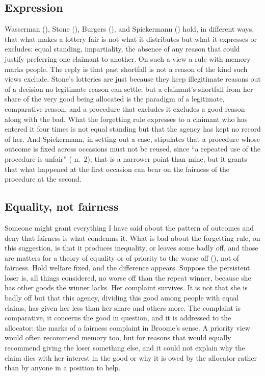 \documentclass[
  11pt,
  letterpaper,
  DIV=11,
  numbers=noendperiod,
  twoside]{scrartcl}
\begin{document}
\subsection{Expression}\label{expression}

Wasserman (), Stone
(), Burgers
(), and Spiekermann
() hold, in different ways, that
what makes a lottery fair is not what it distributes but what it
expresses or excludes: equal standing, impartiality, the absence of any
reason that could justify preferring one claimant to another. On such a
view a rule with memory marks people. The reply is that past shortfall
is not a reason of the kind such views exclude. Stone's lotteries are
just because they keep illegitimate reasons out of a decision no
legitimate reason can settle; but a claimant's shortfall from her share
of the very good being allocated is the paradigm of a legitimate,
comparative reason, and a procedure that excludes it excludes a good
reason along with the bad. What the forgetting rule expresses to a
claimant who has entered it four times is not equal standing but that
the agency has kept no record of her. And Spiekermann, in setting out a
case, stipulates that a procedure whose outcome is fixed across
occasions must not be reused, since ``a repeated use of the procedure is
unfair'' ( n.~2);
that is a narrower point than mine, but it grants that what happened at
the first occasion can bear on the fairness of the procedure at the
second.

\subsection{Equality, not fairness}\label{equality-not-fairness}

Someone might grant everything I have said about the pattern of outcomes
and deny that fairness is what condemns it. What is bad about the
forgetting rule, on this suggestion, is that it produces inequality, or
leaves some badly off, and those are matters for a theory of equality or
of priority to the worse off (),
not of fairness. Hold welfare fixed, and the difference appears. Suppose
the persistent loser is, all things considered, no worse off than the
repeat winner, because she has other goods the winner lacks. Her
complaint survives. It is not that she is badly off but that this
agency, dividing this good among people with equal claims, has given her
less than her share and others more. The complaint is comparative, it
concerns the good in question, and it is addressed to the allocator: the
marks of a fairness complaint in Broome's sense. A priority view would
often recommend memory too, but for reasons that would equally recommend
giving the loser something else, and it could not explain why the claim
dies with her interest in the good or why it is owed by the allocator
rather than by anyone in a position to help.
\end{document}
